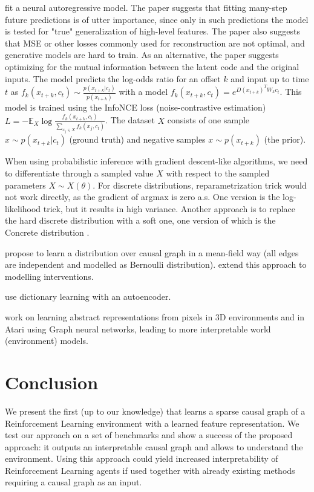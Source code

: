 \documentclass[a4paper,11pt,oneside]{report}
\begin{document}
\cite{VanDenOord2018} fit a neural autoregressive model. The paper suggests that fitting many-step future predictions is of utter importance, since only in such predictions the model is tested for "true" generalization of high-level features. The paper also suggests that MSE or other losses commonly used for reconstruction are not optimal, and generative models are hard to train. As an alternative, the paper suggests optimizing for the mutual information between the latent code and the original inputs. The model predicts the log-odds ratio for an offset $k$ and input up to time $t$ as $f_k(x_{t+k},c_t)\sim \frac{p(x_{t+k}|c_t)}{p(x_{t+k})}$ with a model $f_k(x_{t+k}, c_t)=e^{D(x_{t+k})^TW_kc_t}$. This model is trained using the InfoNCE loss (noise-contrastive estimation) $L=-\mathbb E_X\log\frac{f_k(x_{t+k}, c_t)}{\sum_{x_j\in X}f_k(x_j,c_t)}$. The dataset $X$ consists of one sample $x\sim p(x_{t+k}|c_t)$ (ground truth) and negative samples $x\sim p(x_{t+k})$ (the prior).

When using probabilistic inference with gradient descent-like algorithms, we need to differentiate through a sampled value $X$ with respect to the sampled parameters $X\sim X(\theta)$. For discrete distributions, reparametrization trick would not work directly, as the gradient of argmax is zero a.s. One version is the log-likelihood trick, but it results in high variance. Another approach is to replace the hard discrete distribution with a soft one, one version of which is the Concrete distribution \cite{Maddison2017}.

\cite{kalainathan2018structural, ng2019masked} propose to learn a distribution over causal graph in a mean-field way (all edges are independent and modelled as Bernoulli distribution). \cite{Brouillard2020} extend this approach to modelling interventions.

\cite{Fallah2020} use dictionary learning with an autoencoder.

\cite{kipf2019contrastive} work on learning abstract representations from pixels in 3D environments and in Atari using Graph neural networks, leading to more interpretable world (environment) models.


\chapter{Conclusion}
\label{ch:conclusion}

We present the first (up to our knowledge) that learns a sparse causal graph of a Reinforcement Learning environment with a learned feature representation. We test our approach on a set of benchmarks and show a success of the proposed approach: it outputs an interpretable causal graph and allows to understand the environment. Using this approach could yield increased interpretability of Reinforcement Learning agents if used together with already existing methods requiring a causal graph as an input.
\end{document}
